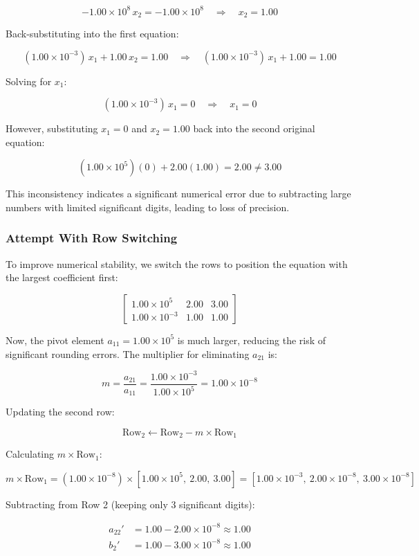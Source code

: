 \documentclass{article}
\begin{document}
{\[
-1.00 \times 10^{8}\, x_2 = -1.00 \times 10^{8} \quad \Rightarrow \quad x_2 = 1.00
\]

Back-substituting into the first equation:

\[
(1.00 \times 10^{-3})\, x_1 + 1.00\, x_2 = 1.00 \quad \Rightarrow \quad (1.00 \times 10^{-3})\, x_1 + 1.00 = 1.00
\]

Solving for \( x_1 \):

\[
(1.00 \times 10^{-3})\, x_1 = 0 \quad \Rightarrow \quad x_1 = 0
\]

However, substituting \( x_1 = 0 \) and \( x_2 = 1.00 \) back into the second original equation:

\[
(1.00 \times 10^{5})(0) + 2.00 (1.00) = 2.00 \neq 3.00
\]

This inconsistency indicates a significant numerical error due to subtracting large numbers with limited significant digits, leading to loss of precision.

\subsubsection*{Attempt With Row Switching}

To improve numerical stability, we switch the rows to position the equation with the largest coefficient first:

\[
\left[ \begin{array}{cc|c}
1.00 \times 10^{5} & 2.00 & 3.00 \\
1.00 \times 10^{-3} & 1.00 & 1.00
\end{array} \right]
\]

Now, the pivot element \( a_{11} = 1.00 \times 10^{5} \) is much larger, reducing the risk of significant rounding errors. The multiplier for eliminating \( a_{21} \) is:

\[
m = \dfrac{a_{21}}{a_{11}} = \dfrac{1.00 \times 10^{-3}}{1.00 \times 10^{5}} = 1.00 \times 10^{-8}
\]

Updating the second row:

\[
\text{Row}_2 \leftarrow \text{Row}_2 - m \times \text{Row}_1
\]

Calculating \( m \times \text{Row}_1 \):

\[
m \times \text{Row}_1 = (1.00 \times 10^{-8}) \times \left[ 1.00 \times 10^{5},\ 2.00,\ 3.00 \right] = [1.00 \times 10^{-3},\ 2.00 \times 10^{-8},\ 3.00 \times 10^{-8}]
\]

Subtracting from Row 2 (keeping only 3 significant digits):

\[
\begin{aligned}
a_{22}' &= 1.00 - 2.00 \times 10^{-8} \approx 1.00 \\
b_2' &= 1.00 - 3.00 \times 10^{-8} \approx 1.00
\end{aligned}
\]

}
\end{document}
